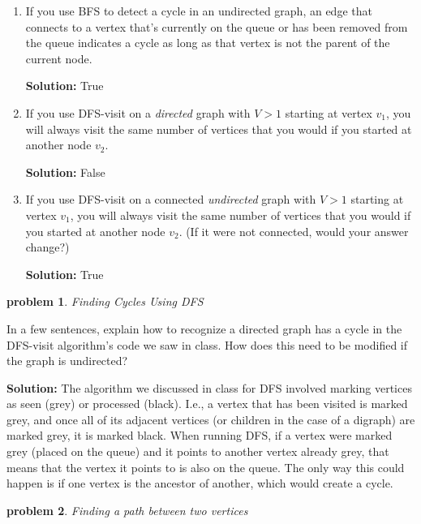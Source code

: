 \documentclass[10pt]{article}
\newcommand{\solution}[1]{\color{blue}\hfill\break\noindent\textbf{Solution:} #1\color{black}}
\newtheorem{problem}{\sc\color{cit}problem}
\begin{document}
\begin{enumerate}
\renewcommand{\theenumi}{\Alph{enumi}}

    \item If you use BFS to detect a cycle in an undirected graph, an edge that connects to a vertex that's currently on the queue or has been removed from the queue indicates a cycle as long as that vertex is not the parent of the current node.

    \solution{    
    True
    }
    
    \item If you use DFS-visit on a \textit{directed} graph with $V>1$ starting at vertex $v_1$, you will always visit the same number of vertices that you would if you started at another node $v_2$.
    
    \solution{
    False
    }
    
    \item If you use DFS-visit on a connected \textit{undirected} graph with $V>1$ starting at vertex $v_1$, you will always visit the same number of vertices that you would if you started at another node $v_2$. (If it were not connected, would your answer change?)
    
    \solution{
    True
    }

\end{enumerate}


\begin{problem} Finding Cycles Using DFS  \end{problem}

In a few sentences, explain how to recognize a directed graph has a cycle in the DFS-visit algorithm's code we saw in class. How does this need to be modified if the graph is undirected?

\solution{
    The algorithm we discussed in class for DFS involved marking vertices as seen (grey) or processed (black). I.e., a vertex that has been visited is marked grey, and once all of its adjacent vertices (or children in the case of a digraph) are marked grey, it is marked black. When running DFS, if a vertex were marked grey (placed on the queue) and it points to another vertex already grey, that means that the vertex it points to is also on the queue. The only way this could happen is if one vertex is the ancestor of another, which would create a cycle.
}


\begin{problem} Finding a path between two vertices \end{problem}
\end{document}
